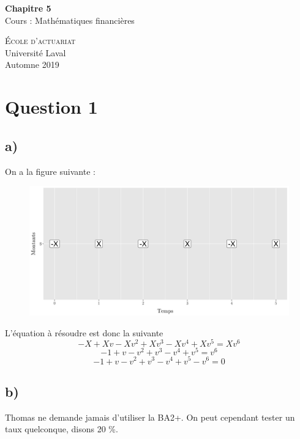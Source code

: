 \documentclass[11pt,french]{article}
\begin{document}
\thispagestyle{empty}

\begin{center}

\vspace{3cm}

{ \LARGE \bfseries Chapitre 5 \\ }
Cours : Mathématiques financières \\

\vfill

\textsc{École d'actuariat}\\
Université Laval\\
Automne 2019

\end{center}

\newpage

\section {Question 1}
\subsection{a)}
On a la figure suivante : 

\begin{figure}[h!] %
    \centering
    \includegraphics[width=1\textwidth]{Figures/figure1.png}
\end{figure}

L'équation à résoudre est donc la suivante
$$
-X + Xv - Xv^2 + Xv^3 - Xv^4 + Xv^5 = Xv^6
$$
$$
-1 + v - v^2 + v^3 - v^4 + v^5 = v^6
$$
$$
-1 + v - v^2 + v^3 - v^4 + v^5 - v^6 = 0
$$

\subsection{b)}
Thomas ne demande jamais d'utiliser la BA2+. On peut cependant tester un taux quelconque, disons 20 \%.
\end{document}
